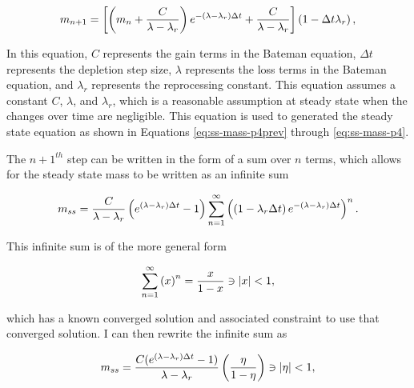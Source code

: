 \begin{equation} \hfill
m_{n+1} = \left[ \left(m_n + \frac{C}{\lambda - \lambda_r} \right)e^{-(\lambda - \lambda_r) \Delta t} + \frac{C}{\lambda - \lambda_r} \right] \left(1 - \Delta t \lambda_r \right),
\hfill\label{eq:nplusone-gen} \end{equation}

In this equation, $C$ represents the gain terms in the Bateman equation, $\Delta t$ represents the depletion step size, $\lambda$ represents the loss terms in the Bateman equation, and $\lambda_r$ represents the reprocessing constant. This equation assumes a constant $C$, $\lambda$, and $\lambda_r$, which is a reasonable assumption at steady state when the changes over time are negligible. This equation is used to generated the steady state equation as shown in Equations \eqref{eq:ss-mass-p4prev} through \eqref{eq:ss-mass-p4}.


The $n+1^{th}$ step can be written in the form of a sum over $n$ terms, which allows for the steady state mass to be written as an infinite sum

\begin{equation} \hfill
m_{ss} =  \frac{C}{\lambda - \lambda_r} \left(e^{(\lambda - \lambda_r) \Delta t} - 1 \right) \sum_{n=1}^{\infty} \left( \left(1 - \lambda_r \Delta t \right) e^{-(\lambda - \lambda_r) \Delta t} \right)^n.
\hfill\label{eq:ss-mass-p4prev} \end{equation}

This infinite sum is of the more general form

\begin{equation} \hfill
\sum_{n=1}^\infty \left( x \right)^n = \frac{x}{1-x} \ni |x| < 1,
\hfill\label{eq:ss-mass-p4next} \end{equation}

which has a known converged solution and associated constraint to use that converged solution. I can then rewrite the infinite sum as

\begin{equation} \hfill
m_{ss} =  \frac{C (e^{(\lambda - \lambda_r) \Delta t} - 1)}{\lambda - \lambda_r}  \left( \frac{\eta}{1 - \eta} \right) \ni \left|\eta \right| < 1,
\hfill\label{eq:ss-mass-p4nextprev} \end{equation}

